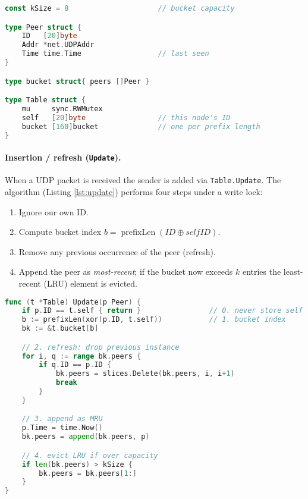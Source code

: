 \documentclass[11pt,a4paper]{article}
\begin{document}
\begin{lstlisting}[language=go,caption={Routing-table excerpt (simplified).}]
const kSize = 8                     // bucket capacity

type Peer struct {
    ID   [20]byte
    Addr *net.UDPAddr
    Time time.Time                  // last seen
}

type bucket struct{ peers []Peer }

type Table struct {
    mu     sync.RWMutex
    self   [20]byte                 // this node's ID
    bucket [160]bucket              // one per prefix length
}
\end{lstlisting}

\paragraph{Insertion / refresh (\texttt{Update}).}
When a UDP packet is received the sender is added via
\lstinline{Table.Update}.  
The algorithm (Listing \ref{lst:update}) performs four
steps under a write lock:

\begin{enumerate}
  \item Ignore our own ID.
  \item Compute bucket index \(b = \operatorname{prefixLen}(ID \oplus selfID)\).
  \item Remove any previous occurrence of the peer (refresh).
  \item Append the peer as \emph{most-recent}; if the bucket now exceeds
        \(k\) entries the least-recent (LRU) element is evicted.
\end{enumerate}

\newpage
\begin{lstlisting}[language=go,caption={Peer refresh / LRU eviction},label={lst:update}]
func (t *Table) Update(p Peer) {
    if p.ID == t.self { return }                // 0. never store self
    b := prefixLen(xor(p.ID, t.self))           // 1. bucket index
    bk := &t.bucket[b]

    // 2. refresh: drop previous instance
    for i, q := range bk.peers {
        if q.ID == p.ID {
            bk.peers = slices.Delete(bk.peers, i, i+1)
            break
        }
    }

    // 3. append as MRU
    p.Time = time.Now()
    bk.peers = append(bk.peers, p)

    // 4. evict LRU if over capacity
    if len(bk.peers) > kSize {
        bk.peers = bk.peers[1:]
    }
}
\end{lstlisting}
\end{document}
